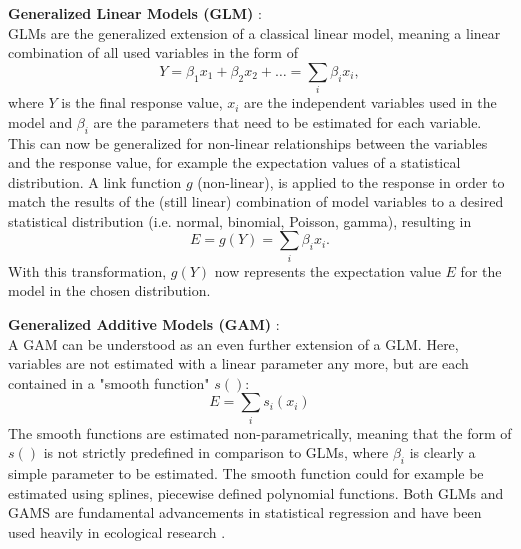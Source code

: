 \documentclass[12pt,a4paper]{article}
\begin{document}
\textbf{Generalized Linear Models (GLM)} \autocite{nelder1972glm}:\\
GLMs are the generalized extension of a classical linear model, meaning a linear combination of all used variables in the form of
\begin{equation}
    \label{eq:lm}
    Y = \beta_1 x_1 + \beta_2 x_2 + \dots = \sum_{i} \beta_i x_i,
\end{equation}
where $Y$ is the final response value, $x_i$ are the independent variables used in the model and $\beta_i$ are the parameters that need to be estimated for each variable.
This can now be generalized for non-linear relationships between the variables and the response value, for example the expectation values of a statistical distribution.
A link function $g$ (non-linear), is applied to the response in order to match the results of the (still linear) combination of model variables to a desired statistical distribution (i.e. normal, binomial, Poisson, gamma), resulting in
\begin{equation}
    \label{eq:glm}
    E = g(Y) = \sum_{i} \beta_i x_i .
\end{equation}
With this transformation, $g(Y)$ now represents the expectation value $E$ for the model in the chosen distribution.

\textbf{Generalized Additive Models (GAM)} \autocite{hastie1986gam}:\\
A GAM can be understood as an even further extension of a GLM. Here, variables are not estimated with a linear parameter any more, but are each contained in a "smooth function" $s()$:
\begin{equation}
    \label{eq:gam}
    E = \sum_{i} s_i(x_i)
\end{equation}
The smooth functions are estimated non-parametrically, meaning that the form of $s()$ is not strictly predefined in comparison to GLMs, where $\beta_i$ is clearly a simple parameter to be estimated.
The smooth function could for example be estimated using splines, piecewise defined polynomial functions.
Both GLMs and GAMS are fundamental advancements in statistical regression and have been used heavily in ecological research \autocite{guisan2002glm-gam}.
\end{document}
